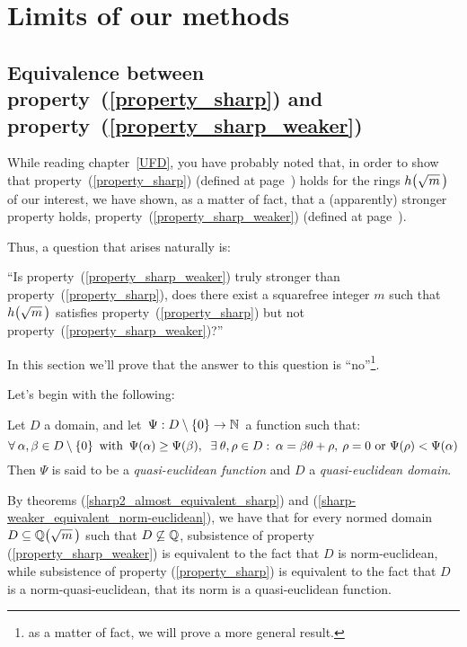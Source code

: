 \chapter{Limits of our methods}\label{limits}

\section{Equivalence between %
property~(\ref{property_sharp}) and %
property~(\ref{property_sharp_weaker})%
}\label{eucilidean_and_quasi-euclidean}

While reading chapter~\ref{UFD}, you have probably
noted that, in order to show that property~(\ref{property_sharp})
(defined at page~\pageref{property_sharp}) holds for the rings
$\hh{m}$ of our interest, we have shown, as a matter of fact, that
a (apparently) stronger property holds, \ie
property~(\ref{property_sharp_weaker})
(defined at page~\pageref{property_sharp_weaker}).

Thus, a question that arises naturally is:

``Is property~(\ref{property_sharp_weaker}) truly stronger
than property~(\ref{property_sharp}), \ie does there exist a
squarefree integer $m$ such that $\hh{m}$ satisfies
property~(\ref{property_sharp}) but not
property~(\ref{property_sharp_weaker})?''

\smallskip
In this section we'll prove that the answer to this
question is ``no''\footnote{as a matter of fact,
we will prove a more general result.}.

\bigskip

Let's begin with the following:

\begin{defn}\label{quasi-euclidean}
Let $D$ a domain, and let\, $\Psi: D\setminus\left\{0\right\}
\rightarrow \mathbb{N}$\, a function such that:
$$
\forall\: \alpha, \beta \in D\setminus\left\{0\right\} \text{ with \,}
\Psi(\alpha) \geq \Psi(\beta),~\: \exists\:
\theta, \rho \in D:\: \alpha = \beta \theta + \rho,
\: \rho = 0 \textrm{\ or\ } \Psi(\rho) < \Psi(\alpha)
$$
\medskip
Then $\Psi$ is said to be a \emph{\/quasi-euclidean function}
and $D$ a \emph{\/quasi-euclidean domain}.
\end{defn}

By theorems (\ref{sharp2_almost_equivalent_sharp})
and (\ref{sharp-weaker_equivalent_norm-euclidean}), we have that for
every normed domain $D \subseteq \QQ{m}$ such that $D \not\subseteq \mathbb{Q}$,
subsistence of property (\ref{property_sharp_weaker}) is equivalent to
the fact that $D$ is norm-euclidean, while subsistence of property
(\ref{property_sharp}) is equivalent to the fact that $D$ is a
norm-quasi-euclidean, \ie that its norm is a quasi-euclidean function.


